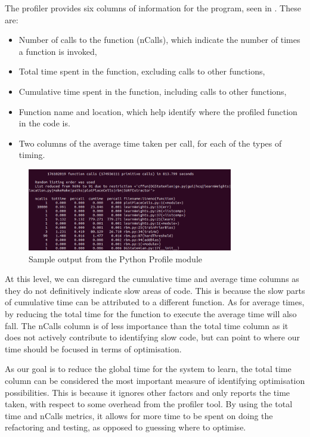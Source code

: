The profiler provides six columns of information for the program, seen in .
These are:
\begin{itemize}
    \item Number of calls to the function (nCalls), which indicate the number of times a function is invoked,
    \item Total time spent in the function, excluding calls to other functions,
    \item Cumulative time spent in the function, including calls to other functions,
    \item Function name and location, which help identify where the profiled function in the code is.
    \item Two columns of the average time taken per call, for each of the types of timing.
\end{itemize}


\begin{figure}[ht]
    \centering
    \includegraphics[width=0.8\textwidth]{figures/lit_tools/profiling.png}
    \caption{Sample output from the Python Profile module}
    \label{fig:pstats}
\end{figure}

At this level, we can disregard the cumulative time and average time columns as they do not definitively indicate slow areas of code.
This is because the slow parts of cumulative time can be attributed to a different function.
As for average times, by reducing the total time for the function to execute the average time will also fall.
The nCalls column is of less importance than the total time column as it does not actively contribute to identifying slow code, but can point to where our time should be focused in terms of optimisation.

As our goal is to reduce the global time for the system to learn, the total time column can be considered the most important measure of identifying optimisation possibilities.
This is because it ignores other factors and only reports the time taken, with respect to some overhead from the profiler tool.
By using the total time and nCalls metrics, it allows for more time to be spent on doing the refactoring and testing, as opposed to guessing where to optimise.




